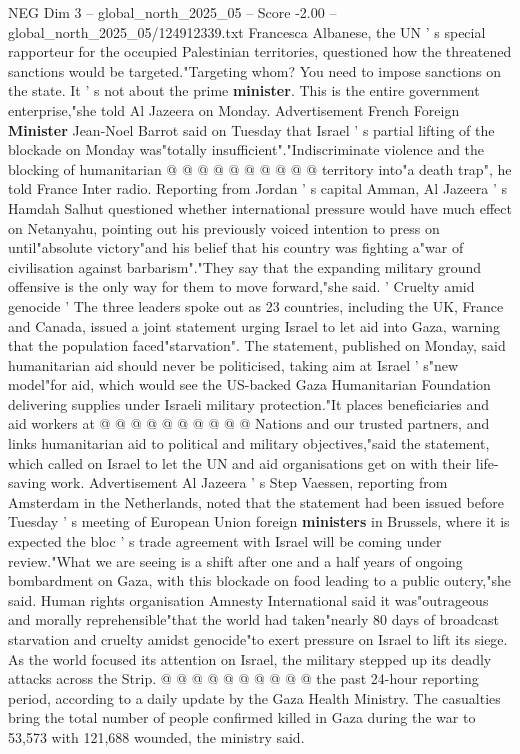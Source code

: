 \begin{textsample}{NEG Dim 3 – global\_north\_2025\_05 – Score -2.00 – global\_north\_2025\_05/124912339.txt}
Francesca Albanese, the UN ' s special rapporteur for the occupied Palestinian territories, questioned how the threatened sanctions would be targeted."Targeting whom?
You need to impose sanctions on the state.
It ' s not about the prime \textbf{minister}.
This is the entire government enterprise,"she told Al Jazeera on Monday.
Advertisement French Foreign \textbf{Minister} Jean-Noel Barrot said on Tuesday that Israel ' s partial lifting of the blockade on Monday was"totally insufficient"."Indiscriminate violence and the blocking of humanitarian @ @ @ @ @ @ @ @ @ @ territory into"a death trap", he told France Inter radio.
Reporting from Jordan ' s capital Amman, Al Jazeera ' s Hamdah Salhut questioned whether international pressure would have much effect on Netanyahu, pointing out his previously voiced intention to press on until"absolute victory"and his belief that his country was fighting a"war of civilisation against barbarism"."They say that the expanding military ground offensive is the only way for them to move forward,"she said. ' Cruelty amid genocide ' The three leaders spoke out as 23 countries, including the UK, France and Canada, issued a joint statement urging Israel to let aid into Gaza, warning that the population faced"starvation".
The statement, published on Monday, said humanitarian aid should never be politicised, taking aim at Israel ' s"new model"for aid, which would see the US-backed Gaza Humanitarian Foundation delivering supplies under Israeli military protection."It places beneficiaries and aid workers at @ @ @ @ @ @ @ @ @ @ Nations and our trusted partners, and links humanitarian aid to political and military objectives,"said the statement, which called on Israel to let the UN and aid organisations get on with their life-saving work.
Advertisement Al Jazeera ' s Step Vaessen, reporting from Amsterdam in the Netherlands, noted that the statement had been issued before Tuesday ' s meeting of European Union foreign \textbf{ministers} in Brussels, where it is expected the bloc ' s trade agreement with Israel will be coming under review."What we are seeing is a shift after one and a half years of ongoing bombardment on Gaza, with this blockade on food leading to a public outcry,"she said.
Human rights organisation Amnesty International said it was"outrageous and morally reprehensible"that the world had taken"nearly 80 days of broadcast starvation and cruelty amidst genocide"to exert pressure on Israel to lift its siege.
As the world focused its attention on Israel, the military stepped up its deadly attacks across the Strip. @ @ @ @ @ @ @ @ @ @ the past 24-hour reporting period, according to a daily update by the Gaza Health Ministry.
The casualties bring the total number of people confirmed killed in Gaza during the war to 53,573 with 121,688 wounded, the ministry said.

\end{textsample}
